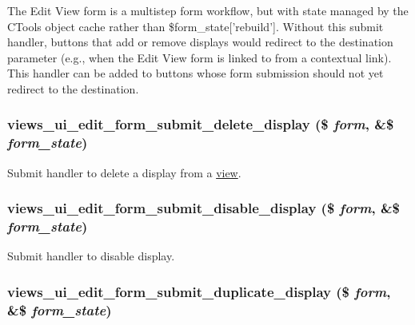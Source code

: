 The Edit View form is a multistep form workflow, but with state managed by the CTools object cache rather than \$form\_\-state\mbox{[}'rebuild'\mbox{]}. Without this submit handler, buttons that add or remove displays would redirect to the destination parameter (e.g., when the Edit View form is linked to from a contextual link). This handler can be added to buttons whose form submission should not yet redirect to the destination. \hypertarget{admin_8inc_a2a91bd9b0b437cb348845844f33fca99}{
\subsubsection[{views\_\-ui\_\-edit\_\-form\_\-submit\_\-delete\_\-display}]{\setlength{\rightskip}{0pt plus 5cm}views\_\-ui\_\-edit\_\-form\_\-submit\_\-delete\_\-display (\$ {\em form}, \/  \&\$ {\em form\_\-state})}}
\label{admin_8inc_a2a91bd9b0b437cb348845844f33fca99}
Submit handler to delete a display from a \hyperlink{classview}{view}. \hypertarget{admin_8inc_a59671db7ec1186790dd4bccbdf913a8c}{
\subsubsection[{views\_\-ui\_\-edit\_\-form\_\-submit\_\-disable\_\-display}]{\setlength{\rightskip}{0pt plus 5cm}views\_\-ui\_\-edit\_\-form\_\-submit\_\-disable\_\-display (\$ {\em form}, \/  \&\$ {\em form\_\-state})}}
\label{admin_8inc_a59671db7ec1186790dd4bccbdf913a8c}
Submit handler to disable display. \hypertarget{admin_8inc_ae053ac5c2b462e488e968d3e3ba78141}{
\subsubsection[{views\_\-ui\_\-edit\_\-form\_\-submit\_\-duplicate\_\-display}]{\setlength{\rightskip}{0pt plus 5cm}views\_\-ui\_\-edit\_\-form\_\-submit\_\-duplicate\_\-display (\$ {\em form}, \/  \&\$ {\em form\_\-state})}}
